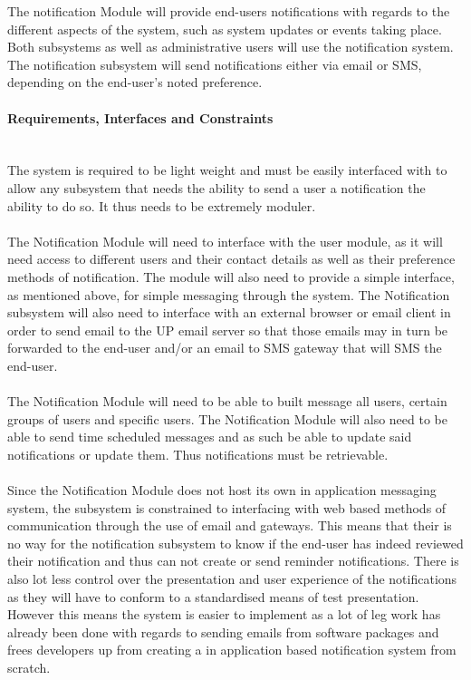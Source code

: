 \documentclass{article}
\begin{document}
				{The notification Module will provide end-users notifications with regards to the different aspects of the system, such as system updates or events taking place. Both subsystems as well as administrative users will use the notification system. The notification subsystem will send notifications either via email or SMS, depending on the end-user's noted preference.}		
		
			\newpage
			\paragraph	{Requirements, Interfaces and Constraints} \mbox{} \\
			{The system is required to be light weight and must be easily interfaced with to allow any subsystem that needs the ability to send a user a notification the ability to do so. It thus needs to be extremely moduler. \\ \\The Notification Module will need to interface with the user module, as it will need access to different users and their contact details as well as their preference methods of notification. The module will also need to provide a simple interface, as mentioned above, for simple messaging through the system. The Notification subsystem will also need to interface with an external browser or email client in order to send email to the UP email server so that those emails may in turn be forwarded to the end-user and/or an email to SMS gateway that will SMS the end-user.\\ \\The Notification Module will need to be able to built message all users, certain groups of users and specific users. The Notification Module will also need to be able to send time scheduled messages and as such be able to update said notifications or update them. Thus notifications must be retrievable.\\ \\Since the Notification Module does not host its own in application messaging system, the subsystem is constrained to interfacing with web based methods of communication through the use of email and gateways. This means that their is no way for the notification subsystem to know if the end-user has indeed reviewed their notification and thus can not create or send reminder notifications. There is also lot less control over the presentation and user experience of the notifications as they will have to conform to a standardised means of test presentation. However this means the system is easier to implement as a lot of leg work has already been done with regards to sending emails from software packages and frees developers up from creating a in application based notification system from scratch.}
		
\end{document}
